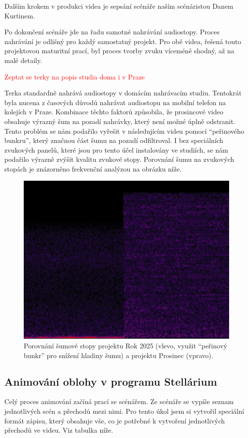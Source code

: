 \documentclass[12pt,a4paper,titlepage]{article}
\begin{document}
Dalším krokem v produkci videa je sepsání scénáře naším scénáristou Danem Kurtinem. 

Po dokončení scénáře jde na řadu samotné nahrávání audiostopy. Proces nahrávání je odlišný pro každý samostatný projekt. Pro obě videa, řešená touto projektovou maturitní prací, byl proces tvorby zvuku víceméně shodný, až na malé detaily. 

\textcolor{red}{Zeptat se terky na popis studia doma i v Praze}

Terka standardně nahrává audiostopy v domácím nahrávacím studiu. Tentokrát byla nucena z časových důvodů nahrávat audiostopu na mobilní telefon na kolejích v Praze. Kombinace těchto faktorů způsobila, že prosincové video obsahuje výrazný šum na pozadí nahrávky, který není možné úplně odstranit. Tento problém se nám podařilo vyřešit v následujícím videu pomocí \enquote{peřinového bunkru}, který značnou část šumu na pozadí odfiltroval. I bez speciálních zvukových panelů, které jsou pro tento účel instalovány ve studiích, se nám podařilo výrazně zvýšit kvalitu zvukové stopy. Porovnání šumu na zvukových stopách je znázorněno frekvenční analýzou na obrázku níže.
\begin{figure}[h]
	\centering
	\includegraphics[width=.4\textwidth]{fourier.png}
	\caption{Porovnání šumové stopy projektu Rok 2025 (vlevo, využit \enquote{peřinový bunkr} pro snížení hladiny šumu) a projektu Prosinec (vpravo).}\label{img:fourier}
\end{figure}
\subsection{Animování oblohy v programu Stellárium}\label{makingof:stellarium}
Celý proces animování začíná prací se scénářem. Ze scénáře se vypíše seznam jednotlivých scén a přechodů mezi nimi. Pro tento úkol jsem si vytvořil speciální formát zápisu, který obsahuje vše, co je potřebné k vytvoření jednotlivých přechodů ve videu. Viz tabulka níže.
\end{document}
